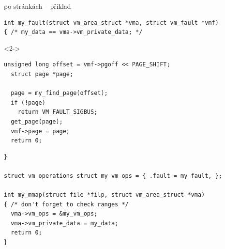 \begin{frame}[fragile]{ po stránkách -- příklad}

  \begin{lstlisting}[belowskip=0pt]
int my_fault(struct vm_area_struct *vma, struct vm_fault *vmf)
{ /* my_data == vma->vm_private_data; */
  \end{lstlisting}
  \begin{uncoverenv}<2->
    \begin{lstlisting}[aboveskip=0pt,belowskip=0pt]
  unsigned long offset = vmf->pgoff << PAGE_SHIFT;
  struct page *page;

  page = my_find_page(offset);
  if (!page)
    return VM_FAULT_SIGBUS;
  get_page(page);
  vmf->page = page;
  return 0;
    \end{lstlisting}
  \end{uncoverenv}
  \begin{lstlisting}[aboveskip=0pt]
}

struct vm_operations_struct my_vm_ops = { .fault = my_fault, };

int my_mmap(struct file *filp, struct vm_area_struct *vma)
{ /* don't forget to check ranges */
  vma->vm_ops = &my_vm_ops;
  vma->vm_private_data = my_data;
  return 0;
}
  \end{lstlisting}

\end{frame}

